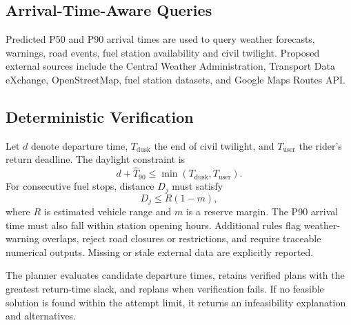 \subsection{Arrival-Time-Aware Queries}
Predicted P50 and P90 arrival times are used to query weather forecasts, warnings, road events, fuel station availability and civil twilight. Proposed external sources include the Central Weather Administration, Transport Data eXchange, OpenStreetMap, fuel station datasets, and Google Maps Routes API.
\subsection{Deterministic Verification}
Let $d$ denote departure time, $T_{\mathrm{dusk}}$ the end of civil twilight, and $T_{\mathrm{user}}$ the rider's return deadline. The daylight constraint is
\begin{equation}
d+\widehat T_{90}\leq\min(T_{\mathrm{dusk}},T_{\mathrm{user}}).
\end{equation}
For consecutive fuel stops, distance $D_j$ must satisfy
\begin{equation}
D_j\leq R(1-m),
\end{equation}
where $R$ is estimated vehicle range and $m$ is a reserve margin. The P90 arrival time must also fall within station opening hours. Additional rules flag weather-warning overlaps, reject road closures or restrictions, and require traceable numerical outputs. Missing or stale external data are explicitly reported.

The planner evaluates candidate departure times, retains verified plans with the greatest return-time slack, and replans when verification fails. If no feasible solution is found within the attempt limit, it returns an infeasibility explanation and alternatives.
